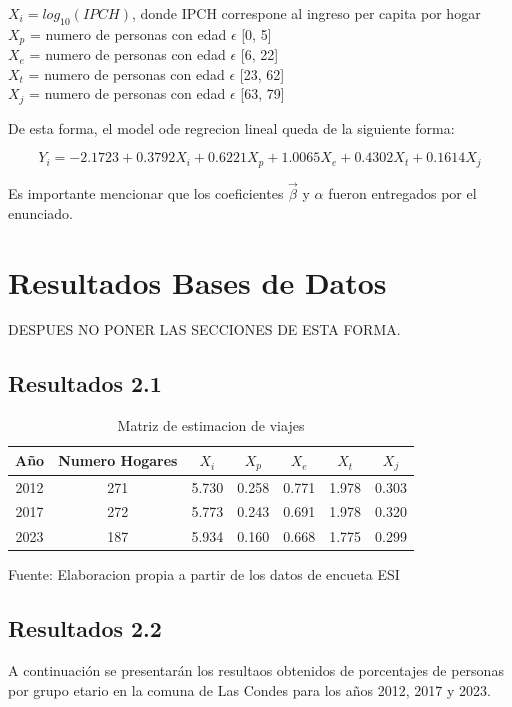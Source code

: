 \documentclass[12pt]{article} %
\begin{document}
\begin{center}
    $X_i = log_{10}(IPCH)$, donde IPCH correspone al ingreso per capita por hogar\\
    $X_p$ = numero de personas con edad $\epsilon$ [0, 5]\\
    $X_e$ = numero de personas con edad $\epsilon$ [6, 22]\\
    $X_t$ = numero de personas con edad $\epsilon$ [23, 62]\\
    $X_j$ = numero de personas con edad $\epsilon$ [63, 79]\\
\end{center}

De esta forma, el model ode regrecion lineal queda de la siguiente forma:

\begin{equation}
    Y_i = -2.1723 + 0.3792X_i + 0.6221X_p + 1.0065X_e + 0.4302X_t + 0.1614X_j
\end{equation}

Es importante mencionar que los coeficientes $\vec{\beta}$ y $\alpha$ fueron entregados por el enunciado.

\section{Resultados Bases de Datos}
DESPUES NO PONER LAS SECCIONES DE ESTA FORMA.

\subsection{Resultados 2.1}

\begin{table}[H]
    \centering
    \begin{tabular}{|c|c|c|c|c|c|c|}
        \hline
        Año & Numero Hogares & $X_i$ & $X_p$ & $X_e$ & $X_t$ & $X_j$ \\
        \hline
        2012 & 271 &5.730 & 0.258 & 0.771 & 1.978 & 0.303 \\
        2017 & 272 &5.773 & 0.243 & 0.691 & 1.978 & 0.320 \\
        2023 & 187 &5.934 & 0.160 & 0.668 & 1.775 & 0.299 \\
        \hline
    \end{tabular}
    \caption{Matriz de estimacion de viajes}
    Fuente: Elaboracion propia a partir de los datos de encueta ESI
\end{table}

\subsection{Resultados 2.2}
A continuación se presentarán los resultaos obtenidos de porcentajes de personas por grupo etario en la comuna de Las Condes para los años 2012, 2017 y 2023.
\end{document}
